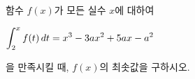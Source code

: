 함수 $f(x)$가 모든 실수 $x$에 대하여 \par\smallskip\noindent\hspace*{1.5em}$\displaystyle\int_{2}^{x}f(t)\mkern3mu dt=x^3-3ax^2+5ax-a^2$\par\smallskip\noindent 을 만족시킬 때, $f(x)$의 최솟값을 구하시오. 
